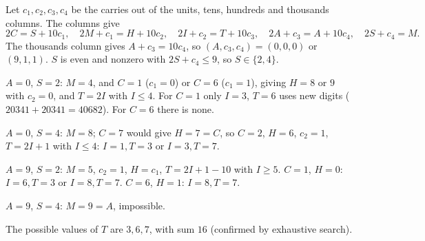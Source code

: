 Let $c_1,c_2,c_3,c_4$ be the carries out of the units, tens, hundreds and thousands columns. The columns give
\[2C=S+10c_1,\quad 2M+c_1=H+10c_2,\quad 2I+c_2=T+10c_3,\quad 2A+c_3=A+10c_4,\quad 2S+c_4=M.\]
The thousands column gives $A+c_3=10c_4$, so $(A,c_3,c_4)=(0,0,0)$ or $(9,1,1)$. $S$ is even and nonzero with $2S+c_4\le9$, so $S\in\{2,4\}$.

$A=0$, $S=2$: $M=4$, and $C=1$ ($c_1=0$) or $C=6$ ($c_1=1$), giving $H=8$ or $9$ with $c_2=0$, and $T=2I$ with $I\le4$. For $C=1$ only $I=3$, $T=6$ uses new digits ($20341+20341=40682$). For $C=6$ there is none.

$A=0$, $S=4$: $M=8$; $C=7$ would give $H=7=C$, so $C=2$, $H=6$, $c_2=1$, $T=2I+1$ with $I\le4$: $I=1,T=3$ or $I=3,T=7$.

$A=9$, $S=2$: $M=5$, $c_2=1$, $H=c_1$, $T=2I+1-10$ with $I\ge5$. $C=1$, $H=0$: $I=6,T=3$ or $I=8,T=7$. $C=6$, $H=1$: $I=8,T=7$.

$A=9$, $S=4$: $M=9=A$, impossible.

The possible values of $T$ are $3,6,7$, with sum $\boxed{16}$ (confirmed by exhaustive search).

